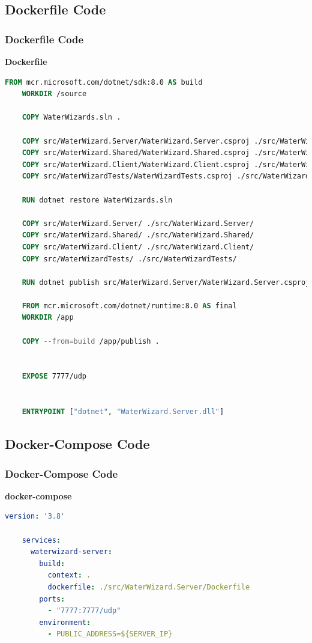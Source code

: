 \documentclass{beamer}
\begin{document}
\subsection{Dockerfile Code}
\begin{frame}[fragile]
\frametitle{Dockerfile Code}
  \textbf{Dockerfile}
  \begin{lstlisting}[language=Dockerfile,basicstyle=\ttfamily\tiny]
    FROM mcr.microsoft.com/dotnet/sdk:8.0 AS build
    WORKDIR /source

    COPY WaterWizards.sln .

    COPY src/WaterWizard.Server/WaterWizard.Server.csproj ./src/WaterWizard.Server/
    COPY src/WaterWizard.Shared/WaterWizard.Shared.csproj ./src/WaterWizard.Shared/
    COPY src/WaterWizard.Client/WaterWizard.Client.csproj ./src/WaterWizard.Client/
    COPY src/WaterWizardTests/WaterWizardTests.csproj ./src/WaterWizardTests/

    RUN dotnet restore WaterWizards.sln

    COPY src/WaterWizard.Server/ ./src/WaterWizard.Server/
    COPY src/WaterWizard.Shared/ ./src/WaterWizard.Shared/
    COPY src/WaterWizard.Client/ ./src/WaterWizard.Client/
    COPY src/WaterWizardTests/ ./src/WaterWizardTests/

    RUN dotnet publish src/WaterWizard.Server/WaterWizard.Server.csproj -c Release -o /app/publish

    FROM mcr.microsoft.com/dotnet/runtime:8.0 AS final
    WORKDIR /app

    COPY --from=build /app/publish .


    EXPOSE 7777/udp


    ENTRYPOINT ["dotnet", "WaterWizard.Server.dll"]
  \end{lstlisting}
\end{frame}

\subsection{Docker-Compose Code}
\begin{frame}[fragile]
\frametitle{Docker-Compose Code}
  \textbf{docker-compose}
  \begin{lstlisting}[language=yaml,basicstyle=\ttfamily\tiny]
    version: '3.8'

    services:
      waterwizard-server:
        build:
          context: .
          dockerfile: ./src/WaterWizard.Server/Dockerfile
        ports:
          - "7777:7777/udp"
        environment:
          - PUBLIC_ADDRESS=${SERVER_IP}
  \end{lstlisting}
\end{frame}
\end{document}
